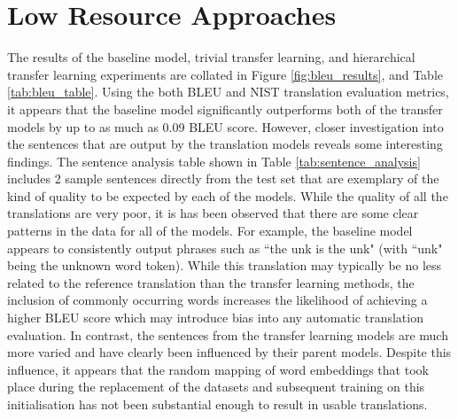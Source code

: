 \section{Low Resource Approaches}





The results of the baseline model, trivial transfer learning, and hierarchical transfer learning experiments are collated in Figure \ref{fig:bleu_results}, and Table \ref{tab:bleu_table}. Using the both  \acrshort{BLEU} and \acrshort{NIST} translation evaluation metrics, it appears that the baseline model significantly outperforms both of the transfer models by up to as much as 0.09 \acrshort{BLEU} score. However, closer investigation into the sentences that are output by the translation models reveals some interesting findings. The sentence analysis table shown in Table \ref{tab:sentence_analysis} includes 2 sample sentences directly from the test set that are exemplary of the kind of quality to be expected by each of the models. While the quality of all the translations are very poor, it is has been observed that there are some clear patterns in the data for all of the models. For example, the baseline model appears to consistently output phrases such as ``the unk is the unk" (with ``unk" being the unknown word token). While this translation may typically be no less related to the reference translation than the transfer learning methods, the inclusion of commonly occurring words increases the likelihood of achieving a higher \acrshort{BLEU} score which may introduce bias into any automatic translation evaluation. In contrast, the sentences from the transfer learning models are much more varied and have clearly been influenced by their parent models. Despite this influence, it appears that the random mapping of word embeddings that took place during the replacement of the datasets and subsequent training on this initialisation has not been substantial enough to result in usable translations. 


